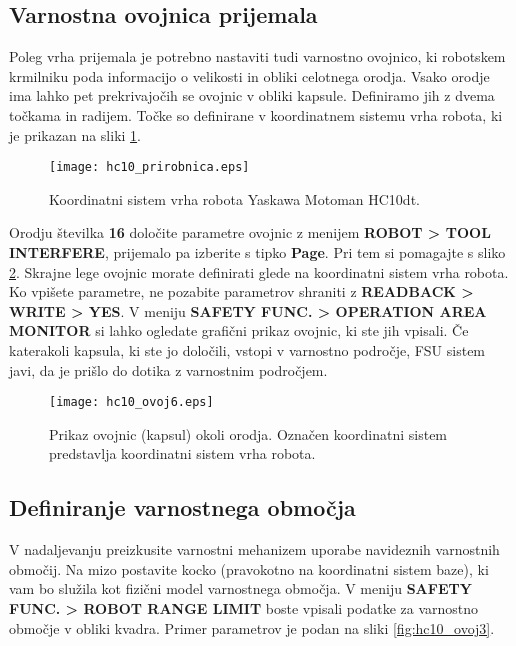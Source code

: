 \subsection*{Varnostna ovojnica prijemala}

Poleg vrha prijemala je potrebno nastaviti tudi varnostno ovojnico, ki robotskem krmilniku poda informacijo o velikosti in obliki celotnega orodja. Vsako orodje ima lahko pet prekrivajočih se ovojnic v obliki kapsule. Definiramo jih z dvema točkama in radijem. Točke so definirane v koordinatnem sistemu vrha robota, ki je prikazan na sliki \ref{fig:hc10_prirobnica}.

\begin{figure}[htbp]
	\centering
	\texttt{[image: hc10\_prirobnica.eps]}
	\caption{Koordinatni sistem vrha robota Yaskawa Motoman HC10dt.}
	\label{fig:hc10_prirobnica}
\end{figure}

Orodju številka \textbf{16} določite parametre ovojnic z menijem \textbf{ROBOT > TOOL INTERFERE}, prijemalo pa izberite s tipko \textbf{Page}. Pri tem si pomagajte s sliko \ref{fig:hc10_ovoj1}. Skrajne lege ovojnic morate definirati glede na koordinatni sistem vrha robota. Ko vpišete parametre, ne pozabite parametrov shraniti z \textbf{READBACK > WRITE > YES}. V meniju \textbf{SAFETY FUNC. > OPERATION AREA MONITOR} si lahko ogledate grafični prikaz ovojnic, ki ste jih vpisali. Če katerakoli kapsula, ki ste jo določili, vstopi v varnostno področje, FSU sistem javi, da je prišlo do dotika z varnostnim področjem.

\begin{figure}[!hbt]
	\centering
	\texttt{[image: hc10\_ovoj6.eps]}
	\caption{Prikaz ovojnic (kapsul) okoli orodja. Označen koordinatni sistem predstavlja koordinatni sistem vrha robota.}
	\label{fig:hc10_ovoj1}
\end{figure}

\subsection*{Definiranje varnostnega območja}

V nadaljevanju preizkusite varnostni mehanizem uporabe navideznih varnostnih območij. Na mizo postavite kocko (pravokotno na koordinatni sistem baze), ki vam bo služila kot fizični model varnostnega območja. V meniju \textbf{SAFETY FUNC. > ROBOT RANGE LIMIT} boste vpisali podatke za varnostno območje v obliki kvadra. Primer parametrov je podan na sliki \ref{fig:hc10_ovoj3}. 

